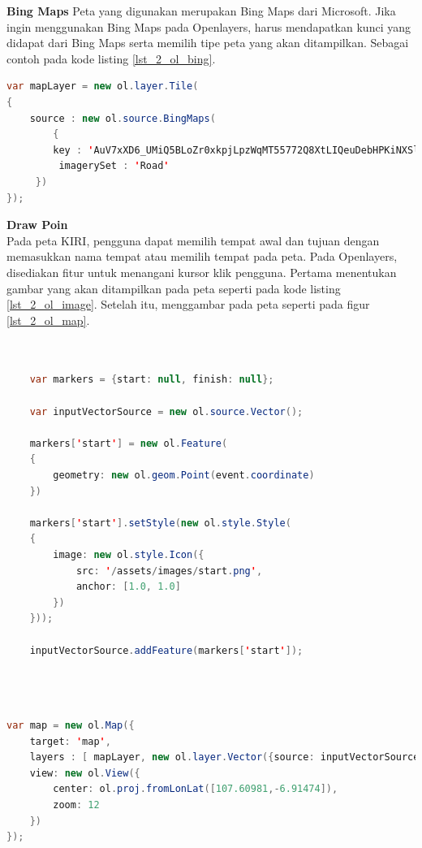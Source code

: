\documentclass[a4paper,twoside]{article}
\begin{document}
\begin{enumerate}
\textbf{Bing Maps}
Peta yang digunakan merupakan Bing Maps dari Microsoft. Jika ingin menggunakan Bing Maps pada Openlayers, harus mendapatkan kunci yang didapat dari Bing Maps serta memilih tipe peta yang akan ditampilkan. Sebagai contoh pada kode listing \ref{lst_2_ol_bing}.

\begin{lstlisting}[caption=Penggunaan Bing Maps pada Openlayers,label = {lst_2_ol_bing},language=Java]
var mapLayer = new ol.layer.Tile(
{
	source : new ol.source.BingMaps(
    	{
     	key : 'AuV7xXD6_UMiQ5BLoZr0xkpjLpzWqMT55772Q8XtLIQeuDebHPKiNXSlZXxEr1GA',
         imagerySet : 'Road'
     })
});
\end{lstlisting}

\textbf{Draw Poin}\\
Pada peta KIRI, pengguna dapat memilih tempat awal dan tujuan dengan memasukkan nama tempat atau memilih tempat pada peta. Pada Openlayers, disediakan fitur untuk menangani kursor klik pengguna. Pertama menentukan gambar yang akan ditampilkan pada peta seperti pada kode listing \ref{lst_2_ol_image}. Setelah itu, menggambar pada peta seperti pada figur \ref{lst_2_ol_map}.


\begin{lstlisting}[caption=Menentukan gambar yang akan dipakai pada peta,label = {lst_2_ol_image},language=Java]

	
	var markers = {start: null, finish: null};
	
	var inputVectorSource = new ol.source.Vector();

	markers['start'] = new ol.Feature(
	{
		geometry: new ol.geom.Point(event.coordinate)
	})
	
	markers['start'].setStyle(new ol.style.Style(
	{
		image: new ol.style.Icon({
			src: '/assets/images/start.png',
			anchor: [1.0, 1.0]
		})
	}));
	
	inputVectorSource.addFeature(markers['start']);
	
	
\end{lstlisting}


\begin{lstlisting}[caption=Menambahkan vektor pada peta,label = {lst_2_ol_map},language=Java]
	
var map = new ol.Map({
    target: 'map',
    layers : [ mapLayer, new ol.layer.Vector({source: inputVectorSource}), new ol.layer.Vector({source: resultVectorSource}) ],
    view: new ol.View({
        center: ol.proj.fromLonLat([107.60981,-6.91474]),
        zoom: 12
    })
});
		

\end{lstlisting}
\end{enumerate}
\end{document}
